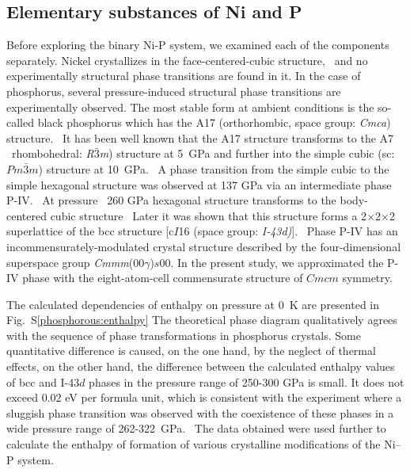 \documentclass[a4paper,10pt]{article}
\begin{document}
\subsection{Elementary substances of Ni and P}
Before exploring the binary Ni-P system, we examined each of the components separately. 
Nickel crystallizes in the face-centered-cubic structure,~\cite{Ni-structure-PhysRev.25.753} and no experimentally structural phase transitions are found in it.
In the case of phosphorus, several pressure-induced structural phase transitions are experimentally observed. 
The most stable form at ambient conditions is the so-called black phosphorus which has the A17 (orthorhombic, space group: {\textit {Cmca}}) structure.~\cite{Black_Phosphorous_1965}
It has been well known that the A17 structure transforms to the A7 ~rhombohedral: {\textit{R$\bar{3}$m}}) structure at 5~GPa and further into the simple cubic (sc: $Pm\bar{3}m$) structure at 10~GPa.~\cite{Jamieson1291,Kikegawa-1983-phosphorous}
A phase transition from the simple cubic to the simple hexagonal structure was observed at 137 GPa via an intermediate phase P-IV.~\cite{Akahama-1999-PhysRevB.59.8520} 
At pressure ~260 GPa hexagonal structure transforms to the body-centered cubic structure~\cite{Akahama-2000-PhysRevB.61.3139} Later it was shown that this structure forms a 2$\times$2$\times$2 superlattice of the bcc structure [c$I$16 (space group: {\textit{I-43d)}}].~\cite{Sugimoto-2012-PhysRevB.86.024109}
Phase P-IV has an incommensurately-modulated   crystal   structure   described   by   the   four-dimensional   superspace   group {\textit{Cmmm}}(00$\gamma$)$s$00.\cite{Fujihisa-2007-PhysRevLett.98.175501,Marques-2008-PhysRevB.78.054120}
In the present study, we approximated the P-IV phase with the eight-atom-cell commensurate structure of $Cmcm$ symmetry.\cite{Marques-2008-PhysRevB.78.054120} 

The calculated dependencies of enthalpy on pressure at 0~K are presented in Fig.~S\ref{phosphorous:enthalpy} 
The theoretical phase diagram qualitatively agrees with the sequence of phase transformations in phosphorus crystals. Some quantitative difference is caused, on the one hand, by the neglect of thermal effects, on the other hand, the difference between the calculated enthalpy values of bcc and I-43$d$ phases in the pressure range of 250-300 GPa is small. 
It does not exceed 0.02 eV per formula unit, which is consistent with the experiment where a sluggish phase transition was observed with the coexistence of these phases in a wide pressure range of 262-322~GPa.~\cite{Sugimoto-2012-PhysRevB.86.024109}
The data obtained were used further to calculate the enthalpy of formation of various crystalline modifications of the Ni--P system.
\end{document}
